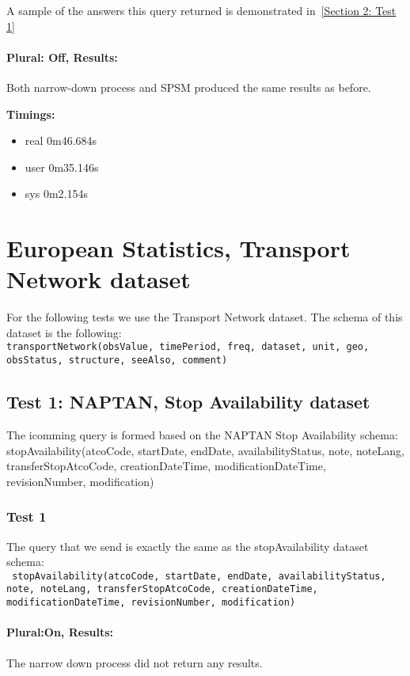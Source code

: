 \documentclass[a4paper,10pt]{article}
\begin{document}
A sample of the answers this query returned is demonstrated in~\ref{Section 2: Test 1}
\paragraph{Plural: Off, Results:}Both narrow-down process and SPSM produced the same results as before.


\textbf{Timings:}
\begin{itemize}
\item real	0m46.684s
\item user	0m35.146s
\item sys	0m2.154s
\end{itemize}

\section{European Statistics, Transport Network dataset} 

For the following tests we use the Transport Network dataset. The schema of this dataset is the following: \\
\indent \texttt{transportNetwork(obsValue, timePeriod, freq, dataset, unit, geo, obsStatus, structure, seeAlso, comment)}


\subsection{Test 1: NAPTAN, Stop Availability dataset }

The icomming query is formed based on the NAPTAN Stop Availability schema:\\
\indent  stopAvailability(atcoCode,	startDate,	endDate,	availabilityStatus,	note,	noteLang,	transferStopAtcoCode,	creationDateTime,	modificationDateTime,	revisionNumber,	modification)			


\subsubsection{Test 1}
The query that we send is exactly the same as the stopAvailability dataset schema:\\
\indent \texttt{  stopAvailability(atcoCode,	startDate,	endDate,	availabilityStatus,	note,	noteLang,	transferStopAtcoCode,	creationDateTime,	modificationDateTime,	revisionNumber,	modification)}			


\paragraph{Plural:On, Results: } The narrow down process did not return any results. 
\end{document}
